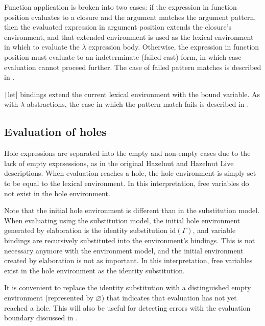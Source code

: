 Function application is broken into two cases: if the expression in function position evaluates to a closure and the argument matches the argument pattern, then the evaluated expression in argument position extends the closure's environment, and that extended environment is used as the lexical environment in which to evaluate the $\lambda$ expression body. Otherwise, the expression in function position must evaluate to an indeterminate (failed cast) form, in which case evaluation cannot proceed further. The case of failed pattern matches is described in .


\texttt|let| bindings extend the current lexical environment with the bound variable. As with $\lambda$-abstractions, the case in which the pattern match fails is described in .

\subsection{Evaluation of holes}
\label{sec:holeenv_evalenv_connection}

Hole expressions are separated into the empty and non-empty cases due to the lack of empty exprsessions, as in the original Hazelnut and Hazelnut Live descriptions. When evaluation reaches a hole, the hole environment is simply set to be equal to the lexical environment. In this interpretation, free variables do not exist in the hole environment.

Note that the initial hole environment is different than in the substitution model. When evaluating using the substitution model, the initial hole environment generated by elaboration is the identity substitution $\text{id}({\Gamma})$, and variable bindings are recursively substituted into the environment's bindings. This is not necessary anymore with the environment model, and the initial environment created by elaboration is not as important. In this interpretation, free variables exist in the hole environment as the identity substitution.

It is convenient to replace the identity substitution with a distinguished empty environment (represented by $\varnothing$) that indicates that evaluation has not yet reached a hole. This will also be useful for detecting errors with the evaluation boundary discussed in .

